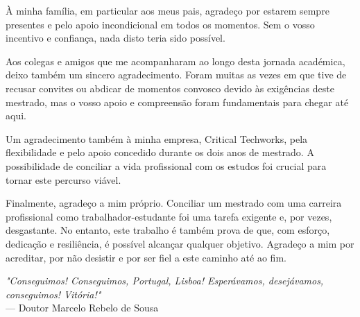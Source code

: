 À minha família, em particular aos meus pais, agradeço por estarem sempre presentes e pelo apoio incondicional em todos os momentos. Sem o vosso incentivo e confiança, nada disto teria sido possível.  

Aos colegas e amigos que me acompanharam ao longo desta jornada académica, deixo também um sincero agradecimento. Foram muitas as vezes em que tive de recusar convites ou abdicar de momentos convosco devido às exigências deste mestrado, mas o vosso apoio e compreensão foram fundamentais para chegar até aqui.  

Um agradecimento também à minha empresa, Critical Techworks, pela flexibilidade e pelo apoio concedido durante os dois anos de mestrado. A possibilidade de conciliar a vida profissional com os estudos foi crucial para tornar este percurso viável.  

Finalmente, agradeço a mim próprio. Conciliar um mestrado com uma carreira profissional como trabalhador-estudante foi uma tarefa exigente e, por vezes, desgastante. No entanto, este trabalho é também prova de que, com esforço, dedicação e resiliência, é possível alcançar qualquer objetivo. Agradeço a mim por acreditar, por não desistir e por ser fiel a este caminho até ao fim.

\vspace*{\fill}
\begin{flushright}
\textit{"Conseguimos! Conseguimos, Portugal, Lisboa! Esperávamos, desejávamos, conseguimos! Vitória!"} \\
--- Doutor Marcelo Rebelo de Sousa
\end{flushright}
\vspace*{\fill}